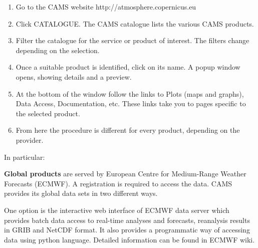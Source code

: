 \documentclass[9pt]{report}
\begin{document}
\begin{enumerate}[noitemsep,topsep=\mdcompacttopsep]%

\item{}Go to the CAMS website http://atmosphere.copernicus.eu%

\item{}Click CATALOGUE. The CAMS catalogue lists the various CAMS products.%

\item{}Filter the catalogue for the service or product of interest. The filters change depending on the selection.%

\item{}Once a suitable product is identified, click on its name. A popup window opens, showing details and a preview.%

\item{}At the bottom of the window follow the links to Plots (maps and graphs), Data Access, Documentation, etc. These links take you to pages specific to the selected product.%

\item{}From here the procedure is different for every product, depending on the provider.%
\end{enumerate}%

\noindent{}In particular:%

\textbf{Global products} are served by European Centre for Medium-Range Weather Forecasts (ECMWF).
A registration is required to access the data. 
CAMS provides its global data sets in two different ways.%

One option is the interactive web interface of ECMWF data server which provides batch data access to real-time analyses and forecasts, reanalysis results in GRIB and NetCDF format.
It also provides a programmatic way of accessing data using python language. Detailed information can be found in ECMWF wiki.%
\end{document}
